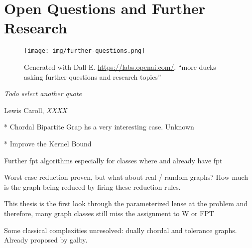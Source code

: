 \chapter{Open Questions and Further Research}\label{ch:closing}

\vspace*{-50pt}

\begin{figure}[ht]
        \texttt{[image: img/further-questions.png]}
        \captionsetup{textformat=empty,labelformat=blank}
        \caption{Generated with Dall-E. \url{https://labs.openai.com/}. ``more ducks asking further questions and research topics''}
\end{figure}

\epigraph{\itshape Todo select another quote}{Lewis Caroll, \textit{XXXX}}

* Chordal Bipartite Grap hs a very interesting case. Unknown

* Improve the Kernel Bound


Further fpt algorithms especially for classes where \sdom and \tdom already have fpt 

Worst case reduction proven, but what about real / random graphs? How much is the graph being reduced by firing these reduction rules.

This thesis is the first look through the parameterized lense at the problem and therefore, many graph classes still miss the assignment to W or FPT

Some classical complexities unresolved: dually chordal and tolerance graphs. Already proposed by galby.
